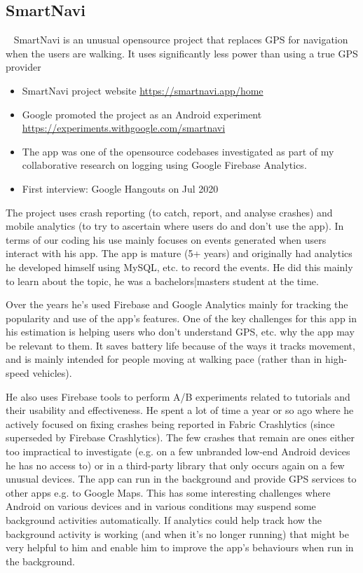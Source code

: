 \clearpage



\clearpage
\subsection{SmartNavi}~\label{study-smartnavi}
SmartNavi is an unusual opensource project that replaces GPS for navigation when the users are walking. It uses significantly less power than using a true GPS provider 

\begin{itemize}
    \item SmartNavi project website \url{https://smartnavi.app/home}
    \item Google promoted the project as an Android experiment \url{https://experiments.withgoogle.com/smartnavi}
    \item The app was one of the opensource codebases investigated as part of my collaborative research on logging using Google Firebase Analytics.
    \item First interview: Google Hangouts on  Jul 2020
\end{itemize}


The project uses crash reporting (to catch, report, and analyse crashes) and mobile analytics (to try to ascertain where users do and don't use the app). In terms of our coding his use mainly focuses on events generated when users interact with his app.
The app is mature (5+ years) and originally had analytics he developed himself using MySQL, etc. to record the events. He did this mainly to learn about the topic, he was a bachelors|masters student at the time.

Over the years he's used Firebase and Google Analytics mainly for tracking the popularity and use of the app's features. One of the key challenges for this app in his estimation is helping users who don't understand GPS, etc. why the app may be relevant to them. It saves battery life because of the ways it tracks movement, and is mainly intended for people moving at walking pace (rather than in high-speed vehicles).

He also uses Firebase tools to perform A/B experiments related to tutorials and their usability and effectiveness.
He spent a lot of time a year or so ago where he actively focused on fixing crashes being reported in Fabric Crashlytics (since superseded by Firebase Crashlytics). The few crashes that remain are ones either too impractical to investigate (e.g. on a few unbranded low-end Android devices he has no access to) or in a third-party library that only occurs again on a few unusual devices.
The app can run in the background and provide GPS services to other apps e.g. to Google Maps. This has some interesting challenges where Android on various devices and in various conditions may suspend some background activities automatically. If analytics could help track how the background activity is working (and when it's no longer running) that might be very helpful to him and enable him to improve the app's behaviours when run in the background.

